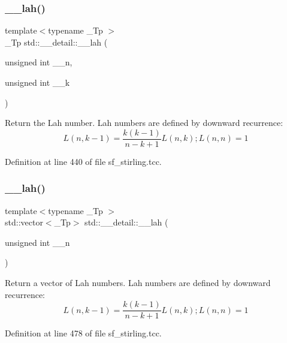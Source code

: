 \subsubsection{\texorpdfstring{\+\_\+\+\_\+lah()}{\_\_lah()}\hspace{0.1cm}{\footnotesize\ttfamily [1/2]}}
{\footnotesize\ttfamily template$<$typename \+\_\+\+Tp $>$ \\
\+\_\+\+Tp std\+::\+\_\+\+\_\+detail\+::\+\_\+\+\_\+lah (\begin{DoxyParamCaption}\item[{unsigned int}]{\+\_\+\+\_\+n,  }\item[{unsigned int}]{\+\_\+\+\_\+k }\end{DoxyParamCaption})\hspace{0.3cm}{\ttfamily [inline]}}

Return the Lah number. Lah numbers are defined by downward recurrence\+: \[ L(n,k-1) = \frac{k(k-1)}{n-k+1}L(n,k); L(n,n) = 1 \] 

Definition at line 440 of file sf\+\_\+stirling.\+tcc.

\mbox{\label{namespacestd_1_1____detail_af6d01a95dbd0418929960fa127e01b99}} 
\subsubsection{\texorpdfstring{\+\_\+\+\_\+lah()}{\_\_lah()}\hspace{0.1cm}{\footnotesize\ttfamily [2/2]}}
{\footnotesize\ttfamily template$<$typename \+\_\+\+Tp $>$ \\
std\+::vector$<$\+\_\+\+Tp$>$ std\+::\+\_\+\+\_\+detail\+::\+\_\+\+\_\+lah (\begin{DoxyParamCaption}\item[{unsigned int}]{\+\_\+\+\_\+n }\end{DoxyParamCaption})\hspace{0.3cm}{\ttfamily [inline]}}

Return a vector of Lah numbers. Lah numbers are defined by downward recurrence\+: \[ L(n,k-1) = \frac{k(k-1)}{n-k+1}L(n,k); L(n,n) = 1 \] 

Definition at line 478 of file sf\+\_\+stirling.\+tcc.

\mbox{\label{namespacestd_1_1____detail_ac3e6ae56f6e6e31636f0bc46a11d9b8e}} 
